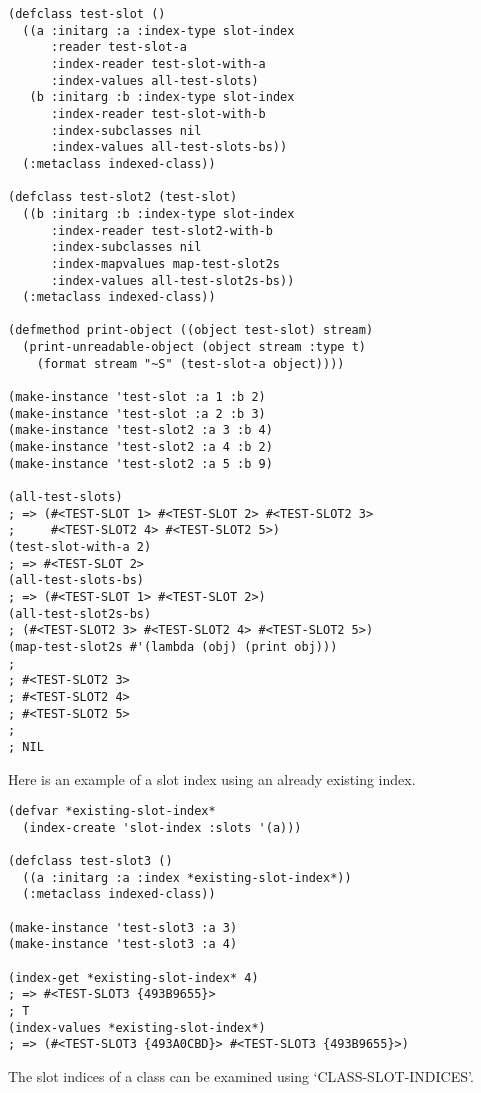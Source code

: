 \begin{Verbatim}[fontsize=\small,frame=leftline,framerule=0.9mm,rulecolor=\color{gray},framesep=5.1mm,xleftmargin=5mm,fontfamily=cmtt]
(defclass test-slot ()
  ((a :initarg :a :index-type slot-index
      :reader test-slot-a
      :index-reader test-slot-with-a
      :index-values all-test-slots)
   (b :initarg :b :index-type slot-index
      :index-reader test-slot-with-b
      :index-subclasses nil
      :index-values all-test-slots-bs))
  (:metaclass indexed-class))

(defclass test-slot2 (test-slot)
  ((b :initarg :b :index-type slot-index
      :index-reader test-slot2-with-b
      :index-subclasses nil
      :index-mapvalues map-test-slot2s
      :index-values all-test-slot2s-bs))
  (:metaclass indexed-class))

(defmethod print-object ((object test-slot) stream)
  (print-unreadable-object (object stream :type t)
    (format stream "~S" (test-slot-a object))))

(make-instance 'test-slot :a 1 :b 2)
(make-instance 'test-slot :a 2 :b 3)
(make-instance 'test-slot2 :a 3 :b 4)
(make-instance 'test-slot2 :a 4 :b 2)
(make-instance 'test-slot2 :a 5 :b 9)

(all-test-slots)
; => (#<TEST-SLOT 1> #<TEST-SLOT 2> #<TEST-SLOT2 3>
;     #<TEST-SLOT2 4> #<TEST-SLOT2 5>)
(test-slot-with-a 2)
; => #<TEST-SLOT 2>
(all-test-slots-bs)
; => (#<TEST-SLOT 1> #<TEST-SLOT 2>)
(all-test-slot2s-bs)
; (#<TEST-SLOT2 3> #<TEST-SLOT2 4> #<TEST-SLOT2 5>)
(map-test-slot2s #'(lambda (obj) (print obj)))
; 
; #<TEST-SLOT2 3> 
; #<TEST-SLOT2 4> 
; #<TEST-SLOT2 5> 
; 
; NIL
\end{Verbatim}
Here is an example of a slot index using an already existing index.

\begin{Verbatim}[fontsize=\small,frame=leftline,framerule=0.9mm,rulecolor=\color{gray},framesep=5.1mm,xleftmargin=5mm,fontfamily=cmtt]
(defvar *existing-slot-index*
  (index-create 'slot-index :slots '(a)))

(defclass test-slot3 ()
  ((a :initarg :a :index *existing-slot-index*))
  (:metaclass indexed-class))

(make-instance 'test-slot3 :a 3)
(make-instance 'test-slot3 :a 4)

(index-get *existing-slot-index* 4)
; => #<TEST-SLOT3 {493B9655}>
; T
(index-values *existing-slot-index*)
; => (#<TEST-SLOT3 {493A0CBD}> #<TEST-SLOT3 {493B9655}>)
\end{Verbatim}
The slot indices of a class can be examined using
`CLASS-SLOT-INDICES'.

